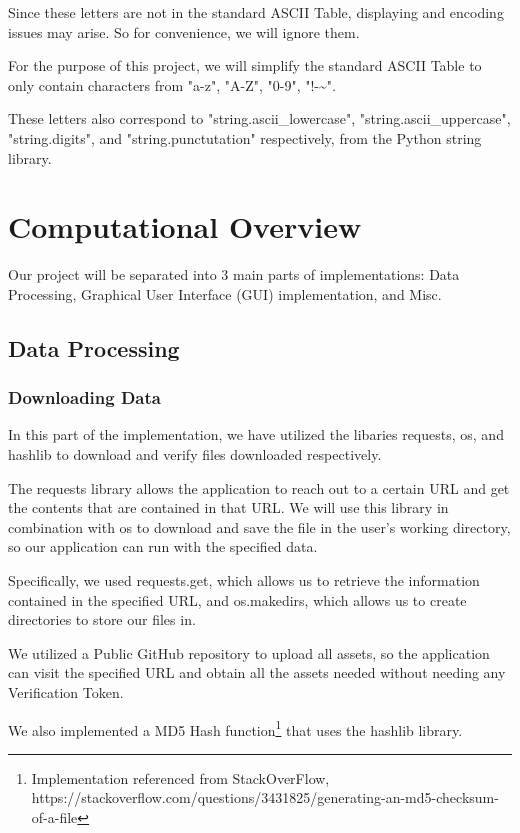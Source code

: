 \documentclass[fontsize=11pt]{article}
\begin{document}
    Since these letters are not in the standard ASCII Table, displaying and encoding issues may arise. So for convenience, we will ignore them.

    For the purpose of this project, we will simplify the standard ASCII Table to only contain characters from "a-z", "A-Z", "0-9", "!-\~{}".

    These letters also correspond to "string.ascii\_lowercase", "string.ascii\_uppercase", "string.digits", and "string.punctutation" respectively, from the Python string library.

    \newpage


    \section{Computational Overview}

    Our project will be separated into 3 main parts of implementations: Data Processing, Graphical User Interface (GUI) implementation, and Misc.

    \subsection{Data Processing}

    \subsubsection{Downloading Data}

    In this part of the implementation, we have utilized the libaries requests, os, and hashlib to download and verify files downloaded respectively.

    The requests library allows the application to reach out to a certain URL and get the contents that are contained in that URL. We will use this library in combination with os to download and save the file in the user's working directory, so our application can run with the specified data.

    Specifically, we used requests.get, which allows us to retrieve the information contained in the specified URL, and os.makedirs, which allows us to create directories to store our files in.

    We utilized a Public GitHub repository to upload all assets, so the application can visit the specified URL and obtain all the assets needed without needing any Verification Token.

    We also implemented a MD5 Hash function\footnote{Implementation referenced from StackOverFlow, https://stackoverflow.com/questions/3431825/generating-an-md5-checksum-of-a-file} that uses the hashlib library.
\end{document}
